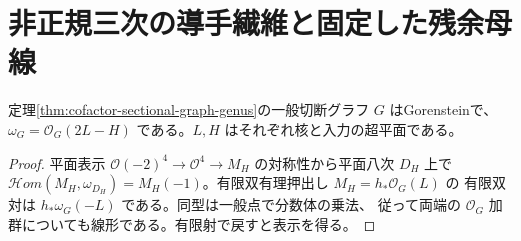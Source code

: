 \section{非正規三次の導手繊維と固定した残余母線}
\label{sec:cofactor-cubic-conductor-base}
\begin{lemma}\label{lem:cofactor-sectional-adjoint}
定理\ref{thm:cofactor-sectional-graph-genus}の一般切断グラフ $G$ はGorensteinで、
$\omega_G=\mathcal O_G(2L-H)$ である。$L,H$ はそれぞれ核と入力の超平面である。
\end{lemma}
\begin{proof}
平面表示 $\mathcal O(-2)^4\to\mathcal O^4\to M_H$ の対称性から平面八次 $D_H$ 上で
$\mathcal Hom(M_H,\omega_{D_H})=M_H(-1)$。有限双有理押出し $M_H=h_*\mathcal O_G(L)$ の
有限双対は $h_*\omega_G(-L)$ である。同型は一般点で分数体の乗法、
従って両端の $\mathcal O_G$ 加群についても線形である。有限射で戻すと表示を得る。
\end{proof}

